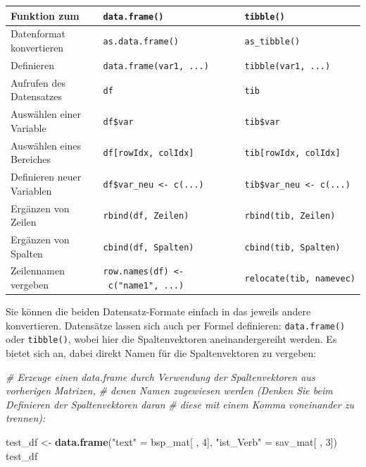 \documentclass[
  ngerman,
]{book}
\newenvironment{Shaded}{\begin{snugshade}}{\end{snugshade}}
\newcommand{\CommentTok}[1]{\textcolor[rgb]{0.56,0.35,0.01}{\textit{#1}}}
\newcommand{\DecValTok}[1]{\textcolor[rgb]{0.00,0.00,0.81}{#1}}
\newcommand{\FunctionTok}[1]{\textcolor[rgb]{0.13,0.29,0.53}{\textbf{#1}}}
\newcommand{\NormalTok}[1]{#1}
\newcommand{\OtherTok}[1]{\textcolor[rgb]{0.56,0.35,0.01}{#1}}
\newcommand{\StringTok}[1]{\textcolor[rgb]{0.31,0.60,0.02}{#1}}
\begin{document}
\begin{longtable}[]{@{}
  >{\centering\arraybackslash}p{}
  >{\centering\arraybackslash}p{}
  >{\centering\arraybackslash}p{}@{}}
\toprule\noalign{}
\begin{minipage}[b]{\linewidth}\centering
Funktion zum
\end{minipage} & \begin{minipage}[b]{\linewidth}\centering
\texttt{data.frame()}
\end{minipage} & \begin{minipage}[b]{\linewidth}\centering
\texttt{tibble()}
\end{minipage} \\
\midrule\noalign{}
\endhead
\bottomrule\noalign{}
\endlastfoot
Datenformat konvertieren & \texttt{as.data.frame()} & \texttt{as\_tibble()} \\
Definieren & \texttt{data.frame(var1,\ ...)} & \texttt{tibble(var1,\ ...)} \\
Aufrufen des Datensatzes & \texttt{df} & \texttt{tib} \\
Auswählen einer Variable & \texttt{df\$var} & \texttt{tib\$var} \\
Auswählen eines Bereiches & \texttt{df{[}rowIdx,\ colIdx{]}} & \texttt{tib{[}rowIdx,\ colIdx{]}} \\
Definieren neuer Variablen & \texttt{df\$var\_neu\ \textless{}-\ c(...)} & \texttt{tib\$var\_neu\ \textless{}-\ c(...)} \\
Ergänzen von Zeilen & \texttt{rbind(df,\ Zeilen)} & \texttt{rbind(tib,\ Zeilen)} \\
Ergänzen von Spalten & \texttt{cbind(df,\ Spalten)} & \texttt{cbind(tib,\ Spalten)} \\
Zeilennamen vergeben & \texttt{row.names(df)\ \textless{}-\ c("name1",\ ...)} & \texttt{relocate(tib,\ namevec)} \\
\end{longtable}

Sie können die beiden Datensatz-Formate einfach in das jeweils andere konvertieren. Datensätze lassen sich auch per Formel definieren: \texttt{data.frame()} oder \texttt{tibble()}, wobei hier die Spaltenvektoren aneinandergereiht werden. Es bietet sich an, dabei direkt Namen für die Spaltenvektoren zu vergeben:

\begin{Shaded}
\begin{Highlighting}[]
\CommentTok{\# Erzeuge einen data.frame durch Verwendung der Spaltenvektoren aus vorherigen Matrizen,}
\CommentTok{\# denen Namen zugewiesen werden (Denken Sie beim Definieren der Spaltenvektoren daran}
\CommentTok{\# diese mit einem Komma voneinander zu trennen):}

\NormalTok{test\_df }\OtherTok{\textless{}{-}} \FunctionTok{data.frame}\NormalTok{(}\StringTok{"text"} \OtherTok{=}\NormalTok{ bsp\_mat[ , }\DecValTok{4}\NormalTok{],}
                      \StringTok{"ist\_Verb"} \OtherTok{=}\NormalTok{ sav\_mat[ , }\DecValTok{3}\NormalTok{])}
\NormalTok{test\_df}
\end{Highlighting}
\end{Shaded}
\end{document}
